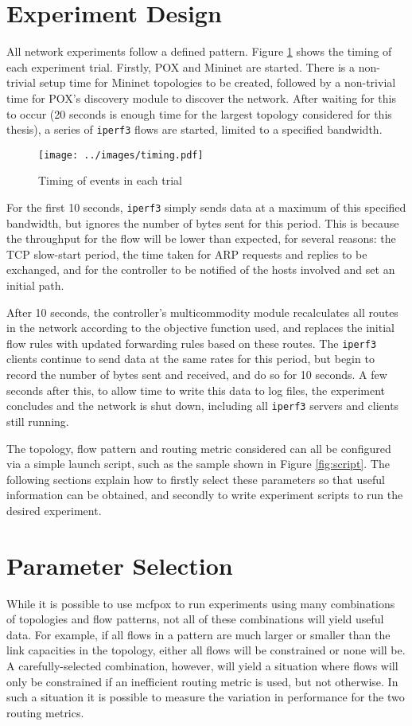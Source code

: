 \section{Experiment Design}
All network experiments follow a defined pattern. Figure \ref{fig:timing} shows the timing of each experiment trial. Firstly, POX and Mininet are started. There is a non-trivial setup time for Mininet topologies to be created, followed by a non-trivial time for POX's discovery module to discover the network. After waiting for this to occur (20 seconds is enough time for the largest topology considered for this thesis), a series of \texttt{iperf3} flows are started, limited to a specified bandwidth. 

\begin{figure}
  \centering
  \texttt{[image: ../images/timing.pdf]}
  \caption{Timing of events in each trial}
  \label{fig:timing}
\end{figure}

For the first 10 seconds, \texttt{iperf3} simply sends data at a maximum of this specified bandwidth, but ignores the number of bytes sent for this period. This is because the throughput for the flow will be lower than expected, for several reasons: the TCP slow-start period, the time taken for ARP requests and replies to be exchanged, and for the controller to be notified of the hosts involved and set an initial path. 

After 10 seconds, the controller's multicommodity module recalculates all routes in the network according to the objective function used, and replaces the initial flow rules with updated forwarding rules based on these routes. The \texttt{iperf3} clients continue to send data at the same rates for this period, but begin to record the number of bytes sent and received, and do so for 10 seconds. A few seconds after this, to allow time to write this data to log files, the experiment concludes and the network is shut down, including all \texttt{iperf3} servers and clients still running.

The topology, flow pattern and routing metric considered can all be configured via a simple launch script, such as the sample shown in Figure \ref{fig:script}. The following sections explain how to firstly select these parameters so that useful information can be obtained, and secondly to write experiment scripts to run the desired experiment. 

\section{Parameter Selection}
While it is possible to use mcfpox to run experiments using many combinations of topologies and flow patterns, not all of these combinations will yield useful data. For example, if all flows in a pattern are much larger or smaller than the link capacities in the topology, either all flows will be constrained or none will be. A carefully-selected combination, however, will yield a situation where flows will only be constrained if an inefficient routing metric is used, but not otherwise. In such a situation it is possible to measure the variation in performance for the two routing metrics.

